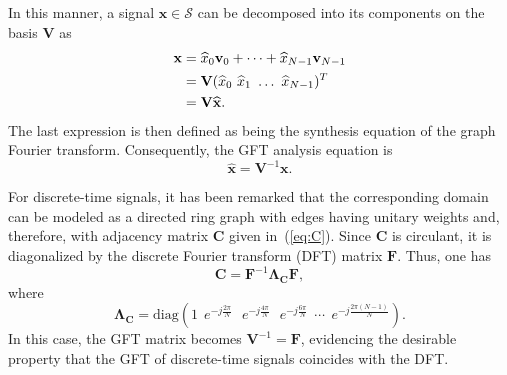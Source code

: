 
In this manner, a signal $ \mathbf{x} \in \mathcal{S} $ can be decomposed into its components on the basis $ \mathbf{V} $ as
\begin{align}\label{eq:GFT_inv}
\mathbf{x} &= \widehat{x}_0 \mathbf{v}_0 + \dots + \widehat{x}_{N-1} \mathbf{v}_{N-1} \notag \\
&= \mathbf{V} (\widehat{x}_0 \ \widehat{x}_1 \ \dots \ \widehat{x}_{N-1})^T \notag \\
&= \mathbf{V} \widehat{\mathbf{x}}.
\end{align}
The last expression is then defined as being the synthesis equation of the graph Fourier transform. Consequently, the GFT analysis equation is
\begin{equation}\label{eq:GFT_fwd}
\widehat{\mathbf{x}} = \mathbf{V}^{-1} \mathbf{x}.
\end{equation}

For discrete-time signals, it has been remarked that the corresponding domain can be modeled as a directed ring graph with edges having unitary weights and, therefore, with adjacency matrix $ \mathbf{C} $ given in~(\ref{eq:C}). Since $ \mathbf{C} $ is circulant, it is diagonalized by the discrete Fourier transform (DFT) matrix $ \mathbf{F} $. Thus, one has
\begin{equation}\label{eq:diag_C}
\mathbf{C} = \mathbf{F}^{-1} \mathbf{\Lambda}_{\mathbf{C}} \mathbf{F},
\end{equation}
where $$ \mathbf{\Lambda}_{\mathbf{C}} = \text{diag}\left(
1 \:\
e^{-j \frac{2\pi}{N}} \:\:\
e^{-j \frac{4\pi}{N}}\:\: \
e^{-j \frac{6\pi}{N}} \:\: \cdots \:\:
e^{-j \frac{2\pi (N-1)}{N}}
\right).$$In this case, the GFT matrix becomes $ \mathbf{V}^{-1} = \mathbf{F} $, evidencing the desirable property that the GFT of discrete-time signals coincides with the DFT.

